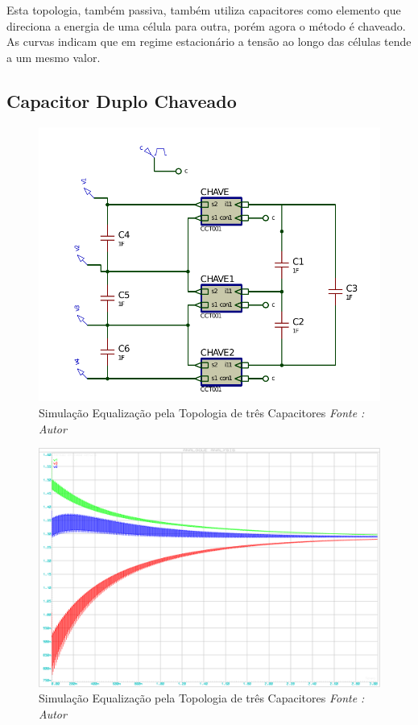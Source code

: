 \documentclass[11pt, a4paper, oneside]{article}
\begin{document}
Esta topologia, também passiva, também utiliza capacitores como elemento
que direciona a energia de uma célula para outra, porém agora o método é
chaveado. As curvas indicam que em regime estacionário a tensão ao longo das
células tende a um mesmo valor.

\newpage

\subsection{Capacitor Duplo Chaveado}

\begin{figure}[h!]
\centering
\includegraphics[width=1\linewidth]{etc_3_capacitor}
\caption{Simulação Equalização pela Topologia de três Capacitores \textit{Fonte : Autor}}
\label{fig:estrutura_equalizador_passivo_ apacitor}
\end{figure}

\begin{figure}[h!]
\centering
\includegraphics[width=1\linewidth]{tres_capacitores}
\caption{Simulação Equalização pela Topologia de três Capacitores \textit{Fonte : Autor}}
\label{fig:estrutura_equalizador_passivo_ apacitor}
\end{figure}
\end{document}
